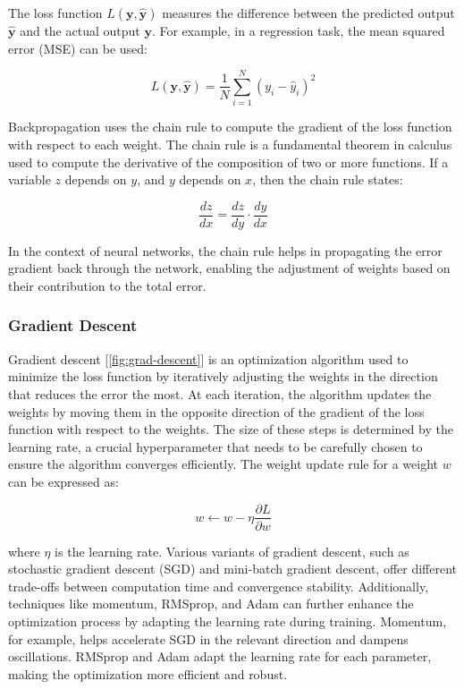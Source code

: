 \documentclass[../Thesis.tex]{subfiles}
\begin{document}
	The loss function \(L(\mathbf{y}, \mathbf{\hat{y}})\) measures the difference between the predicted output \(\mathbf{\hat{y}}\) and the actual output \(\mathbf{y}\). For example, in a regression task, the mean squared error (MSE) can be used:
	
	\[
	L(\mathbf{y}, \mathbf{\hat{y}}) = \frac{1}{N} \sum_{i=1}^{N} (y_i - \hat{y}_i)^2
	\]
	
	Backpropagation uses the chain rule to compute the gradient of the loss function with respect to each weight. The chain rule is a fundamental theorem in calculus used to compute the derivative of the composition of two or more functions. If a variable \(z\) depends on \(y\), and \(y\) depends on \(x\), then the chain rule states:
	
	\[
	\frac{dz}{dx} = \frac{dz}{dy} \cdot \frac{dy}{dx}
	\]
	
	In the context of neural networks, the chain rule helps in propagating the error gradient back through the network, enabling the adjustment of weights based on their contribution to the total error.
	
	
	
	\subsubsection{Gradient Descent}
	Gradient descent [\autoref{fig:grad-descent}] is an optimization algorithm used to minimize the loss function by iteratively adjusting the weights in the direction that reduces the error the most. At each iteration, the algorithm updates the weights by moving them in the opposite direction of the gradient of the loss function with respect to the weights. The size of these steps is determined by the learning rate, a crucial hyperparameter that needs to be carefully chosen to ensure the algorithm converges efficiently. The weight update rule for a weight \(w\) can be expressed as:
	
	\[
	w \leftarrow w - \eta \frac{\partial L}{\partial w}
	\]
	
	where \(\eta\) is the learning rate. Various variants of gradient descent, such as stochastic gradient descent (SGD) and mini-batch gradient descent, offer different trade-offs between computation time and convergence stability. Additionally, techniques like momentum, RMSprop, and Adam can further enhance the optimization process by adapting the learning rate during training. Momentum, for example, helps accelerate SGD in the relevant direction and dampens oscillations. RMSprop and Adam adapt the learning rate for each parameter, making the optimization more efficient and robust.
	
\end{document}
